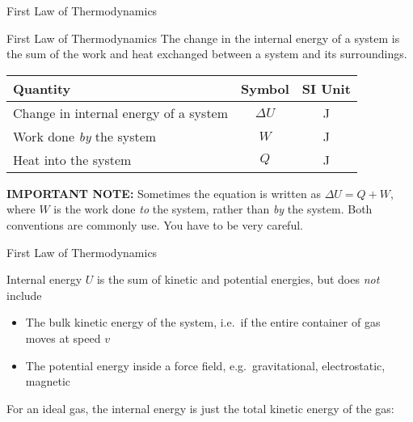 \documentclass[12pt,aspectratio=169]{beamer}
\newcommand{\eq}[2]{\vspace{#1}{\Large\begin{displaymath}#2\end{displaymath}}}
\begin{document}
\begin{frame}{First Law of Thermodynamics}
  \begin{block}{First Law of Thermodynamics}
    The change in the internal energy of a system is the sum of the work and
    heat exchanged between a system and its surroundings. 
  \end{block}
  
  \eq{-.2in}{
    \boxed{\Delta U=Q-W}
  }
  \begin{center}
    \begin{tabular}{l|c|c}
      \rowcolor{pink}
      \textbf{Quantity} & \textbf{Symbol} & \textbf{SI Unit} \\ \hline
      Change in internal energy of a system & $\Delta U$   & \si{\joule} \\
      Work done \emph{by} the system & $W$                 & \si{\joule} \\
      Heat into the system           & $Q$                 & \si{\joule}
    \end{tabular}
  \end{center}
  \vspace{.1in}\textbf{IMPORTANT NOTE:} Sometimes the equation is written as
  $\Delta U=Q+W$, where $W$ is the work done \emph{to} the system, rather
  than \emph{by} the system. Both conventions are commonly use. You have to
  be very careful.
\end{frame}


\begin{frame}{First Law of Thermodynamics}
  \eq{-.2in}{
    \boxed{\Delta U=Q-W}
  }
  
  Internal energy $U$ is the sum of kinetic and potential energies, but does
  \emph{not} include
  \begin{itemize}
  \item The bulk kinetic energy of the system, i.e.\ if the entire container
    of gas moves at speed $v$
  \item The potential energy inside a force field, e.g.\ gravitational,
    electrostatic, magnetic
  \end{itemize}
  For an ideal gas, the internal energy is just the total kinetic energy of the
  gas:

  \eq{-.2in}{
    U=K=\frac{3}{2}NkT=\frac{3}{2}nRT
  }
\end{frame}
\end{document}
